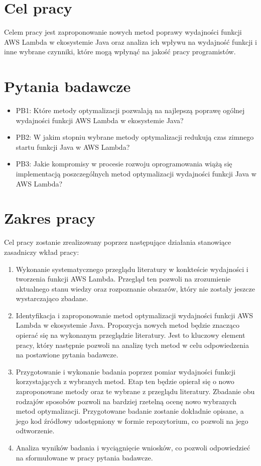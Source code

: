 \section*{Cel pracy}\label{chapter:cel_pracy}

Celem pracy jest zaproponowanie nowych metod poprawy wydajności funkcji AWS Lambda w ekosystemie Java oraz analiza ich wpływu na wydajność funkcji i inne wybrane czynniki, które mogą wpłynąć na jakość pracy programistów. 

\section*{Pytania badawcze}\label{chapter:pytania_badawcze}

\begin{itemize}
    \item PB1: Które metody optymalizacji pozwalają na najlepszą poprawę ogólnej wydajności funkcji AWS Lambda w ekosystemie Java?
    \item PB2: W jakim stopniu wybrane metody optymalizacji redukują czas zimnego startu funkcji Java w AWS Lambda?
    \item PB3: Jakie kompromisy w procesie rozwoju oprogramowania wiążą się implementacją poszczególnych metod optymalizacji wydajności funkcji Java w AWS Lambda?
\end{itemize}

\section*{Zakres pracy}\label{chapter:zakres_pracy}

Cel pracy zostanie zrealizowany poprzez następujące działania stanowiące zasadniczy wkład pracy:
\begin{enumerate}
    \item Wykonanie systematycznego przeglądu literatury w konkteście wydajności i tworzenia funkcji AWS Lambda. 
    Przegląd ten pozwoli na zrozumienie aktualnego stanu wiedzy oraz rozpoznanie obszarów, który nie zostały jeszcze wystarczająco zbadane. 
    \item Identyfikacja i zaproponowanie metod optymalizacji wydajności funkcji AWS Lambda w ekosystemie Java. 
    Propozycja nowych metod będzie znacząco opierać się na wykonanym przeglądzie literatury. 
    Jest to kluczowy element pracy, który następnie pozwoli na analizę tych metod w celu odpowiedzenia na postawione pytania badawcze.
    \item Przygotowanie i wykonanie badania poprzez pomiar wydajności funkcji korzystających z wybranych metod.
    Etap ten będzie opierał się o nowo zaproponowane metody oraz te wybrane z przeglądu literatury.
    Zbadanie obu rodzajów sposobów pozwoli na bardziej rzetelną ocenę nowo wybranych metod optymalizacji.
    Przygotowane badanie zostanie dokładnie opisane, a jego kod źródłowy udostępniony w formie repozytorium, co pozwoli na jego odtworzenie.
    \item Analiza wyników badania i wyciągnięcie wniosków, co pozwoli odpowiedzieć na sformułowane w pracy pytania badawcze. 
\end{enumerate}

